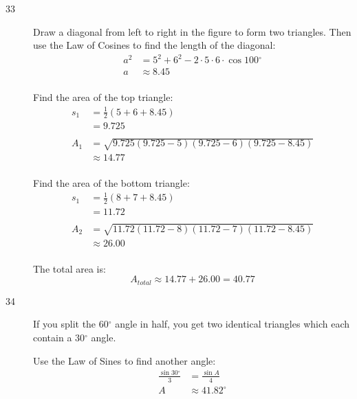 \documentclass{exam}
\newcommand{\dg}{\ensuremath{^\circ}}
\begin{document}
\begin{description}
      \pagebreak

      \item[33]
        Draw a diagonal from left to right in the figure to form two triangles.  Then use the Law of Cosines to find the
        length of the diagonal:
        \begin{align*}
          a^2 & = 5^2 + 6^2 - 2 \cdot 5 \cdot 6 \cdot \cos 100 \dg \\
          a   & \approx 8.45 \\
        \end{align*}

        Find the area of the top triangle:
        \begin{align*}
          s_1 & = \frac{1}{2}(5 + 6 + 8.45) \\
              & = 9.725 \\
          \\
          A_1 & = \sqrt{9.725 (9.725 - 5)(9.725 - 6) (9.725 - 8.45)} \\
              & \approx 14.77 \\
        \end{align*}

        Find the area of the bottom triangle:
        \begin{align*}
          s_1 & = \frac{1}{2}(8 + 7 + 8.45) \\
              & = 11.72 \\
          \\
          A_2 & = \sqrt{11.72 (11.72 - 8)(11.72 - 7) (11.72 - 8.45)} \\
              & \approx 26.00 \\
        \end{align*}

        The total area is: 
        \[
          A_{total} \approx 14.77 + 26.00 = \boxed{ 40.77 }
        \]

      \pagebreak

      \item[34]
        If you split the $60 \dg$ angle in half, you get two identical triangles which each contain a $30 \dg$ angle.

        Use the Law of Sines to find another angle:
        \begin{align*}
          \frac{\sin 30 \dg}{3} & = \frac{\sin A}{4} \\
          A                     & \approx 41.82 \dg \\
        \end{align*}


\end{description}
\end{document}
